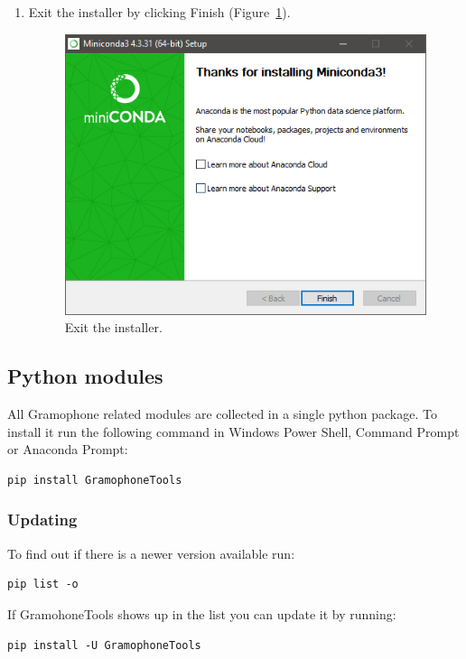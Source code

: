 \documentclass[11pt,a4paper]{article}
\begin{document}
\begin{enumerate}
\item Exit the installer by clicking Finish (Figure~\ref{fig:miniconda_install_done2}).
	\begin{figure}[H]
	\centering
	\includegraphics[scale=0.8]{miniconda_install_done2.PNG}
	\caption{Exit the installer.}
	\label{fig:miniconda_install_done2}
	\end{figure}

\end{enumerate}

\newpage
\subsection{Python modules}
All Gramophone related modules are collected in a single python package. To install it run the following command in Windows Power Shell, Command Prompt or Anaconda Prompt:
\begin{verbatim}
pip install GramophoneTools
\end{verbatim}


\subsubsection{Updating}
To find out if there is a newer version available run:
\begin{verbatim}
pip list -o
\end{verbatim}

If GramohoneTools shows up in the list you can update it by running:
\begin{verbatim}
pip install -U GramophoneTools
\end{verbatim}
\end{document}
